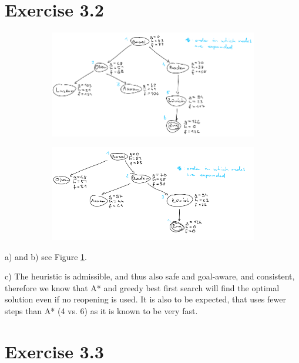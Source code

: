 \documentclass[12pt]{article}
\begin{document}
\section*{Exercise 3.2}

\begin{figure}[h!]
    \begin{subfigure}[t]{\textwidth}
        \centering
        \includegraphics[width=\textwidth]{figures/3.2a.png}
        \caption{}
    \end{subfigure}
    \begin{subfigure}[t]{\textwidth}
        \centering
        \includegraphics[width=\textwidth]{figures/3.2b.png}
        \caption{}
    \end{subfigure}
    \caption{}
    \label{3.2}
\end{figure}

a) and b) see Figure \ref{3.2}.

c) The heuristic is admissible, and thus also safe and goal-aware, and consistent, therefore we know that A* and greedy best first search will find the optimal solution even if no reopening is used. It is also to be expected, that uses fewer steps than A* (4 vs. 6) as it is known to be very fast.


\section*{Exercise 3.3}
\end{document}
